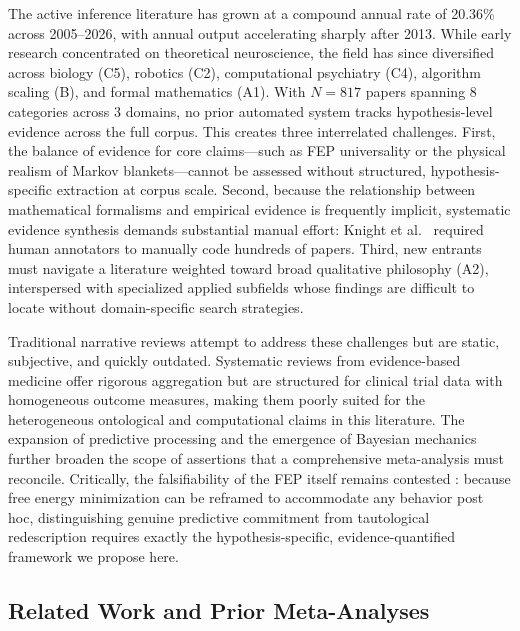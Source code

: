 \documentclass[
  english,
]{article}
\begin{document}
The active inference literature has grown at a compound annual rate of
20.36\% across 2005--2026, with annual output accelerating sharply after
2013. While early research concentrated on theoretical neuroscience, the
field has since diversified across biology (C5), robotics (C2),
computational psychiatry (C4), algorithm scaling (B), and formal
mathematics (A1). With \(N = 817\) papers spanning 8 categories across 3
domains, no prior automated system tracks hypothesis-level evidence
across the full corpus. This creates three interrelated challenges.
First, the balance of evidence for core claims---such as FEP
universality or the physical realism of Markov blankets---cannot be
assessed without structured, hypothesis-specific extraction at corpus
scale. Second, because the relationship between mathematical formalisms
and empirical evidence is frequently implicit, systematic evidence
synthesis demands substantial manual effort: Knight et
al.~\citep{knight2022fep} required human annotators to manually code
hundreds of papers. Third, new entrants must navigate a literature
weighted toward broad qualitative philosophy (A2), interspersed with
specialized applied subfields whose findings are difficult to locate
without domain-specific search strategies.

Traditional narrative reviews attempt to address these challenges but
are static, subjective, and quickly outdated. Systematic reviews from
evidence-based medicine offer rigorous aggregation but are structured
for clinical trial data with homogeneous outcome measures, making them
poorly suited for the heterogeneous ontological and computational claims
in this literature. The expansion of predictive processing
\citep{clark2013whatever, hohwy2013predictive} and the emergence of
Bayesian mechanics \citep{sakthivadivel2023bayesian} further broaden the
scope of assertions that a comprehensive meta-analysis must reconcile.
Critically, the falsifiability of the FEP itself remains contested
\citep{colombo2021free}: because free energy minimization can be
reframed to accommodate any behavior post hoc, distinguishing genuine
predictive commitment from tautological redescription requires exactly
the hypothesis-specific, evidence-quantified framework we propose here.

\subsection{Related Work and Prior
Meta-Analyses}\label{related-work-and-prior-meta-analyses}
\end{document}
